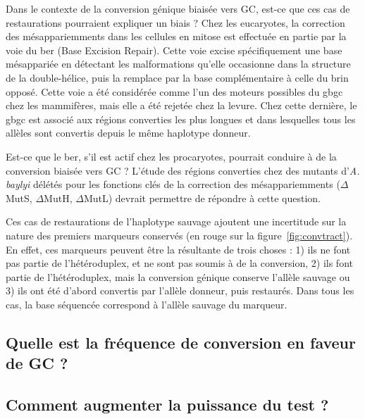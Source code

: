 Dans le contexte de la conversion génique biaisée vers GC, est-ce que ces cas de
restaurations pourraient expliquer un biais ? Chez les eucaryotes, la correction
des mésappariemments dans les cellules en mitose est effectuée en partie par la
voie du \ac{ber} (Base Excision Repair). Cette voie excise spécifiquement une
base mésappariée en détectant les malformations qu'elle occasionne dans la
structure de la double-hélice, puis la remplace par la base complémentaire à
celle du brin opposé\cite{krokan_base_2013}. Cette voie a été considérée comme
l'un des moteurs possibles du \ac{gbgc} chez les
mammifères\cite{duret_biased_2009}, mais elle a été rejetée chez la
levure\cite{lesecque_gc-biased_2013}. Chez cette dernière, le \ac{gbgc} est
associé aux régions converties les plus longues et dans lesquelles tous les
allèles sont convertis depuis le même haplotype donneur.

Est-ce que le \ac{ber}, s'il est actif chez les procaryotes, pourrait conduire à
de la conversion biaisée vers GC ? L'étude des régions converties chez des
mutants d'\emph{A. baylyi} délétés pour les fonctions clés de la correction des
mésappariemments ($\Delta$MutS, $\Delta$MutH, $\Delta$MutL) devrait permettre de
répondre à cette question.

Ces cas de restaurations de l'haplotype sauvage ajoutent une incertitude sur la
nature des premiers marqueurs conservés (en rouge sur la
figure~\ref{fig:convtract}). En effet, ces marqueurs peuvent être la résultante
de trois choses : 1) ils ne font pas partie de l'hétéroduplex, et ne sont pas
soumis à de la conversion, 2) ils font partie de l'hétéroduplex, mais la
conversion génique conserve l'allèle sauvage ou 3) ils ont été d'abord convertis
par l'allèle donneur, puis restaurés. Dans tous les cas, la base séquencée
correspond à l'allèle sauvage du marqueur.

\subsection{Quelle est la fréquence de conversion en faveur de GC ?}
\label{subsec:discu-freq}

\subsection{Comment augmenter la puissance du test ?}
\label{subsub:discu-puissance}

